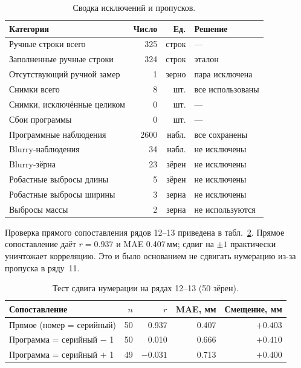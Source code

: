\documentclass[12pt,a4paper]{article}
\begin{document}
\begin{table}[htbp]
\centering\small
\caption{Сводка исключений и пропусков.}
\label{tab:exclusions}
\begin{tabular}{@{}lrrl@{}}
\toprule
Категория & Число & Ед. & Решение \\
\midrule
Ручные строки всего & 325 & строк & — \\
Заполненные ручные строки & 324 & строк & эталон \\
Отсутствующий ручной замер & 1 & зерно & пара исключена \\
Снимки всего & 8 & шт. & все использованы \\
Снимки, исключённые целиком & 0 & шт. & — \\
Сбои программы & 0 & шт. & — \\
Программные наблюдения & 2600 & набл. & все сохранены \\
Blurry-наблюдения & 34 & набл. & не исключены \\
Blurry-зёрна & 23 & зёрен & не исключены \\
Робастные выбросы длины & 5 & зёрен & не исключены \\
Робастные выбросы ширины & 3 & зерна & не исключены \\
Выбросы массы & 2 & зерна & не используются \\
\bottomrule
\end{tabular}
\end{table}

Проверка прямого сопоставления рядов 12--13 приведена в
табл.~\ref{tab:shift}. Прямое сопоставление даёт $r = \num{0.937}$ и
MAE \num{0.407}\,мм; сдвиг на $\pm 1$ практически уничтожает корреляцию.
Это и было основанием не сдвигать нумерацию из-за пропуска в ряду~11.

\begin{table}[htbp]
\centering\small
\caption{Тест сдвига нумерации на рядах 12--13 (50 зёрен).}
\label{tab:shift}
\begin{tabular}{@{}lrrrr@{}}
\toprule
Сопоставление & $n$ & $r$ & MAE, мм & Смещение, мм \\
\midrule
Прямое (номер = серийный) & 50 & \num{0.937} & \num{0.407} & $+\num{0.403}$ \\
Программа = серийный $-$ 1 & 50 & \num{0.010} & \num{0.666} & $+\num{0.410}$ \\
Программа = серийный $+$ 1 & 49 & $-\num{0.031}$ & \num{0.713} & $+\num{0.400}$ \\
\bottomrule
\end{tabular}
\end{table}
\end{document}
